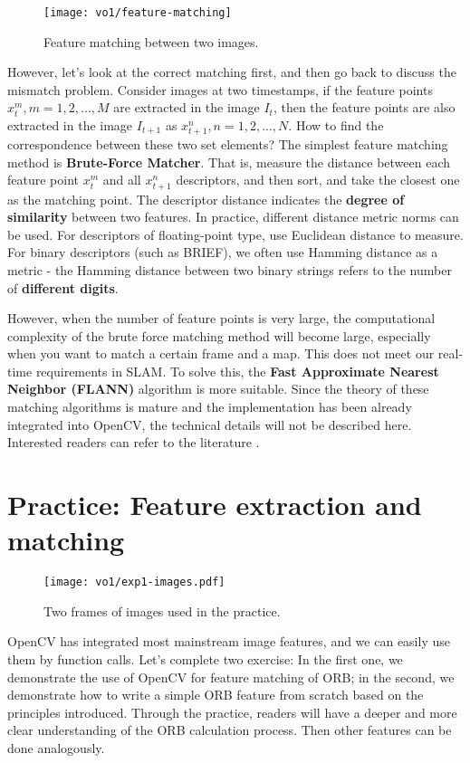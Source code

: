 \begin{figure}[!htp]
    \centering
    \texttt{[image: vo1/feature-matching]}
    \caption{Feature matching between two images.}
    \label{fig:feature-matching}
\end{figure}

However, let’s look at the correct matching first, and then go back to discuss the mismatch problem. Consider images at two timestamps, if the feature points $x_{t}^{m}, m=1,2,...,M$ are extracted in the image $I_{t}$, then the feature points are also extracted in the image $I_{t+1}$ as $x_{t+1}^{n}, n=1,2,...,N$. How to find the correspondence between these two set elements? The simplest feature matching method is \textbf{Brute-Force Matcher}. That is, measure the distance between each feature point $x_{t}^{m}$ and all $x_{t+1}^{n}$ descriptors, and then sort, and take the closest one as the matching point. The descriptor distance indicates the \textbf{degree of similarity} between two features. In practice, different distance metric norms can be used. For descriptors of floating-point type, use Euclidean distance to measure. For binary descriptors (such as BRIEF), we often use Hamming distance as a metric - the Hamming distance between two binary strings refers to the number of \textbf{different digits}.

However, when the number of feature points is very large, the computational complexity of the brute force matching method will become large, especially when you want to match a certain frame and a map. This does not meet our real-time requirements in SLAM. To solve this, the \textbf{Fast Approximate Nearest Neighbor (FLANN)} algorithm is more suitable. Since the theory of these matching algorithms is mature and the implementation has been already integrated into OpenCV, the technical details will not be described here. Interested readers can refer to the literature \cite{Muja2009}.

\section{Practice: Feature extraction and matching}
\begin{figure}[!htp]
	\centering
	\texttt{[image: vo1/exp1-images.pdf]}
	\caption{Two frames of images used in the practice.}
	\label{fig:exp1-images}
\end{figure}

OpenCV has integrated most mainstream image features, and we can easily use them by function calls. Let's complete two exercise: In the first one, we demonstrate the use of OpenCV for feature matching of ORB; in the second, we demonstrate how to write a simple ORB feature from scratch based on the principles introduced. Through the practice, readers will have a deeper and more clear understanding of the ORB calculation process. Then other features can be done analogously.


